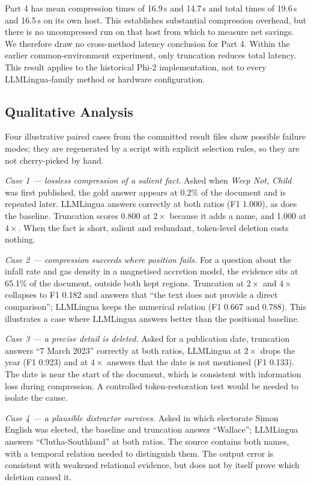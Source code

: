 \documentclass[10pt,a4paper,twocolumn]{article}
\begin{document}
Part 4 has mean compression times of 16.9\,s and 14.7\,s and total times of
19.6\,s and 16.5\,s on its own host. This establishes substantial compression
overhead, but there is no uncompressed run on that host from which to measure
net savings. We therefore draw no cross-method latency conclusion for Part 4.
Within the earlier common-environment experiment, only truncation reduces total
latency. This result applies to the historical Phi-2 implementation, not to every
LLMLingua-family method or hardware configuration.

\subsection{Qualitative Analysis}

Four illustrative paired cases from the committed result files show possible failure modes;
they are regenerated by a script with explicit selection rules, so they are not
cherry-picked by hand.

\emph{Case 1 --- lossless compression of a salient fact.} Asked when \emph{Weep
Not, Child} was first published, the gold answer appears at 0.2\% of the document
and is repeated later. LLMLingua answers correctly at both ratios (F1 1.000), as
does the baseline. Truncation scores 0.800 at $2\times$ because it adds a name, and 1.000 at $4\times$. When the fact is short, salient and redundant, token-level
deletion costs nothing.

\emph{Case 2 --- compression succeeds where position fails.} For a question about
the infall rate and gas density in a magnetised accretion model, the evidence sits
at 65.1\% of the document, outside both kept regions. Truncation at $2\times$ and
$4\times$ collapses to F1 0.182 and answers that ``the text does not provide a
direct comparison''; LLMLingua keeps the numerical relation (F1 0.667 and 0.788).
This illustrates a case where LLMLingua answers better than the positional baseline.

\emph{Case 3 --- a precise detail is deleted.} Asked for a publication date,
truncation answers ``7 March 2023'' correctly at both ratios, LLMLingua at
$2\times$ drops the year (F1 0.923) and at $4\times$ answers that the date is not
mentioned (F1 0.133). The date is near the start of the document, which is consistent with information loss during compression. A controlled token-restoration test would be needed to isolate the cause.

\emph{Case 4 --- a plausible distractor survives.} Asked in which electorate Simon
English was elected, the baseline and truncation answer ``Wallace''; LLMLingua
answers ``Clutha-Southland'' at both ratios. The source contains both names,
with a temporal relation needed to distinguish them. The output error is consistent with weakened relational evidence, but does not by itself prove which deletion caused it.
\end{document}
